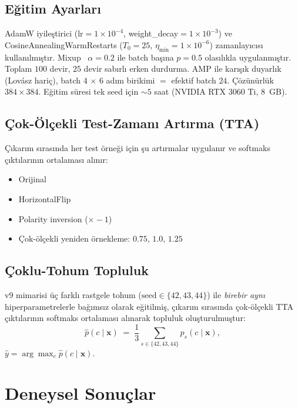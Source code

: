 \documentclass[conference,a4paper,10pt]{IEEEtran}
\begin{document}
\subsection{Eğitim Ayarları}

AdamW iyileştirici (lr$=$$1\!\times\!10^{-4}$, weight\_decay$=$$1\!\times\!10^{-3}$)
ve CosineAnnealingWarmRestarts ($T_0{=}25$, $\eta_{\min}{=}1\!\times\!10^{-6}$)
zamanlayıcısı kullanılmıştır. Mixup~\cite{zhang2018mixup} $\alpha{=}0.2$
ile batch başına $p{=}0.5$ olasılıkla uygulanmıştır. Toplam $100$ devir,
$25$ devir sabırlı erken durdurma. AMP ile karışık duyarlık (Lovász hariç),
batch $4$ $\times$ $6$ adım birikimi $=$ efektif batch $24$. Çözünürlük
$384 \times 384$. Eğitim süresi tek seed için $\sim$$5$ saat
(NVIDIA RTX 3060 Ti, 8~GB).

\subsection{Çok-Ölçekli Test-Zamanı Artırma (TTA)}

Çıkarım sırasında her test örneği için şu artırmalar uygulanır ve softmaks
çıktılarının ortalaması alınır:
\begin{itemize}
\item Orijinal
\item HorizontalFlip
\item Polarity inversion ($\times -1$)
\item Çok-ölçekli yeniden örnekleme: $0.75$, $1.0$, $1.25$
\end{itemize}

\subsection{Çoklu-Tohum Topluluk}

v9 mimarisi üç farklı rastgele tohum ($\text{seed} \in \{42, 43, 44\}$) ile
\emph{birebir aynı} hiperparametrelerle bağımsız olarak eğitilmiş, çıkarım
sırasında çok-ölçekli TTA çıktılarının softmaks ortalaması alınarak topluluk
oluşturulmuştur:
\begin{equation}
\hat{p}(c \mid \mathbf{x}) \;=\; \frac{1}{3}\sum_{s \in \{42,43,44\}} p_s(c \mid \mathbf{x}),
\end{equation}
$\hat{y} = \arg\max_{c} \hat{p}(c \mid \mathbf{x})$.

\section{Deneysel Sonuçlar}
\label{sec:sonuclar}
\end{document}
